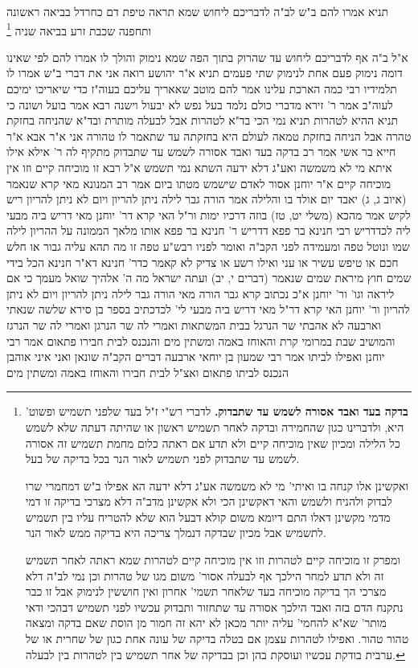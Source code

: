 \documentclass[12pt, openany]{book}
\newcommand{\footnotecomment}[1]{\footnote{#1}}
\newcommand{\commenta}[1]{\footnotecomment{#1}}
\begin{document}
{תניא אמרו להם ב"ש לב"ה  לדבריכם ליחוש שמא תראה טיפת דם כחרדל בביאה ראשונה ותחפנה שכבת זרע בביאה שניה 
\commenta{\textbf{בדקה בעד ואבד אסורה לשמש עד שתבדוק.}  לדברי רש"י ז"ל בעד שלפני תשמיש ופשוט' היא, ולדברינו כגון שהחמירה ובדקה לאחר תשמיש ראשון או שהיתה דעתה שלא לשמש כל הלילה ומכיון שאין מוכיחה קיים ולא תדע אם ראתה כלום מחמת תשמיש זה אסורה לשמש עד שתבדוק לפני תשמיש לאור הנר בכל בדיקה של בעל.\par  ואקשינן אלו קנחה בו ואיתי' מי לא משמשה אע"ג דלא ידעה הא אפילו ב"ש דמחמרי שרו לבדוק ולהניח ולשמש והאי דאקשינן הכי ולא אקשינן מדב"ה דלא מצרכי בדיקה זו דמי מדמי מקשינן דאלו התם דיומא משום קולא דבעל הוא שלא להטריח עליו בין תשמיש לתשמיש אבל מכיון שבדקה דנמלך צריכה היא בדיקה ממש לאור הנר.\par  ומפרק זו מוכיחה קיים לטהרות וזו אין מוכיחה קיים לטהרות שמא ראתה לאחר תשמיש זה ולא תדע למחר הילכך אף לבעלה אסור' משום מגו של טהרות וכן נמי לב"ה דלא מצרכי הך בדיקה מוכיחה בעד שלאחר תשמי' אחרון ואין חוששין לנימוק אבל זו כבר נתקנח הדם בזה ואבד הילכך אסורה עד שתחזור ותבדוק עכשיו לפני תשמיש דבהכי ודאי מותר' שא"א להחמי' עליה יותר מכאן לא יהא זה חמור מן הוסת שאם בדקה ומצאה טהור טהור. ואפילו לטהרות עצמן אם בטלה בדיקה של עונה אחת כגון של שחרית או של ערבית בודקת עכשיו ועוסקת בהן וכן בבדיקה של אחר תשמיש בין לטהרות בין לבעלה. }

א"ל ב"ה  אף לדבריכם ליחוש עד שהרוק בתוך הפה שמא נימוק והולך לו 
אמרו להם  לפי שאינו דומה נימוק פעם אחת לנימוק שתי פעמים 
תניא א"ר יהושע  רואה אני את דברי ב"ש  אמרו לו  תלמידיו רבי כמה הארכת עלינו  אמר להם  מוטב שאאריך עליכם בעוה"ז כדי שיאריכו ימיכם לעוה"ב 
אמר ר' זירא  מדברי כולם נלמד בעל נפש לא יבעול וישנה 
רבא אמר  בועל ושונה כי תניא ההיא לטהרות 
תניא נמי הכי  בד"א לטהרות אבל לבעלה מותרת  ובד"א שהניחה בחזקת טהרה אבל הניחה בחזקת טמאה לעולם היא בחזקתה עד שתאמר לו טהורה אני 
א"ר אבא א"ר חייא בר אשי אמר רב  בדקה בעד ואבד אסורה לשמש עד שתבדוק  מתקיף לה ר' אילא  אילו איתא מי לא משמשה ואע"ג דלא ידעה  השתא נמי תשמש 
א"ל רבא  זו מוכיחה קיים וזו אין מוכיחה קיים
א"ר יוחנן   אסור לאדם שישמש מטתו ביום  אמר רב המנונא מאי קרא  שנאמר  (איוב ג, ג) יאבד יום אולד בו והלילה אמר הורה גבר לילה ניתן להריון ויום לא ניתן להריון  ריש לקיש אמר מהכא  (משלי יט, טז) בוזה דרכיו ימות 
ור"ל האי קרא דר' יוחנן מאי דריש ביה  מבעי ליה לכדדריש רבי חנינא בר פפא  דדריש ר' חנינא בר פפא  אותו מלאך הממונה על ההריון לילה שמו ונוטל טפה ומעמידה לפני הקב"ה ואומר לפניו  רבש"ע טפה זו מה תהא עליה  גבור או חלש חכם או טיפש עשיר או עני 
ואילו רשע או צדיק לא קאמר כדר' חנינא  דא"ר חנינא  הכל בידי שמים חוץ מיראת שמים שנאמר  (דברים י, יב) ועתה ישראל מה ה' אלהיך שואל מעמך כי אם ליראה וגו' 
ור' יוחנן א"כ נכתוב קרא גבר הורה מאי הורה גבר  לילה ניתן להריון ויום לא ניתן להריון 
ור' יוחנן האי קרא דר"ל מאי דריש ביה  מבעי לי' לכדכתיב בספר בן סירא  שלשה שנאתי וארבעה לא אהבתי  שר הנרגל בבית המשתאות ואמרי לה  שר הנרגן ואמרי לה  שר הנרגז
והמושיב שבת במרומי קרת והאוחז באמה ומשתין מים  והנכנס לבית חבירו פתאום  אמר רבי יוחנן  ואפילו לביתו 
אמר רבי שמעון בן יוחאי  ארבעה דברים הקב"ה שונאן ואני איני אוהבן  הנכנס לביתו פתאום ואצ"ל לבית חבירו  והאוחז באמה ומשתין מים}
\end{document}
